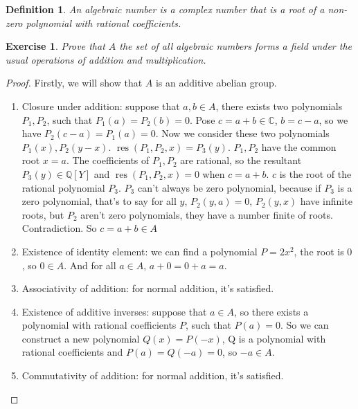 \documentclass{article}
\newtheorem{definition}{Definition}
\newtheorem{exercise}{Exercise}
\begin{document}
\begin{definition}
    An algebraic number is a complex number that is a root of a non-zero polynomial with rational coefficients.
\end{definition}

\begin{exercise}
    Prove that \(A\) the set of all algebraic numbers forms a field under the usual operations of addition and multiplication.
\end{exercise}

\begin{proof}
    Firstly, we will show that \(A\) is an additive abelian group.
    \begin{enumerate}
        \item Closure under addition: suppose that \(a, b \in A\), there exists two polynomials \(P_{1}, P_{2}\), such that \(P_{1}(a) = P_{2}(b) = 0\). Pose \(c = a+b \in \mathbb{C}\), \(b = c-a\), so we have \(P_{2}(c-a) = P_{1}(a) =0\). Now we consider these two polynomials \(P_{1}(x), P_{2}(y-x)\). \(\operatorname{res}(P_{1}, P_{2}, x) = P_{3}(y)\). \(P_{1}, P_{2}\) have the common root \(x = a\). The coefficients of \(P_{1}, P_{2}\) are rational, so the resultant \(P_{3}(y) \in \mathbb{Q}[Y]\) and \(\operatorname{res}(P_{1}, P_{2}, x) = 0\) when \(c = a+b\). \(c\) is the root of the rational polynomial \(P_{3}\). \(P_{3}\) can't always be zero polynomial, because if \(P_{3}\) is a zero polynomial, that's to say for all \(y\), \(P_{2}(y, a) = 0\), \(P_{2}(y,x)\) have infinite roots, but \(P_{2}\) aren't zero polynomials, they have a number finite of roots. Contradiction. So \(c = a+b \in A\)
        \item Existence of identity element: we can find a polynomial \(P = 2x^{2}\), the root is \(0\), so \(0 \in A\). And for all \(a \in A\), \(a+0 = 0+a = a\).
        \item Associativity of addition: for normal addition, it's satisfied.
        \item Existence of additive inverses: suppose that \(a \in A\), so there exists a polynomial with rational coefficients \(P\), such that \(P(a) = 0\). So we can construct a new polynomial \(Q(x) = P(-x)\), Q is a polynomial with rational coefficients and \(P(a) = Q(-a) = 0\), so \(-a \in A\).
        \item Commutativity of addition: for normal addition, it's satisfied.
    \end{enumerate}


\end{proof}
\end{document}
